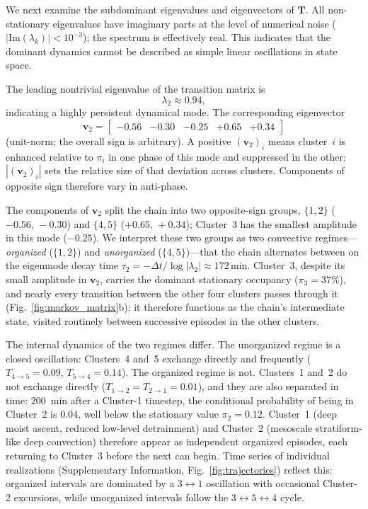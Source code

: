 \documentclass[11pt]{article}
\begin{document}
We next examine the subdominant eigenvalues and eigenvectors of
$\mathbf{T}$.
All non-stationary eigenvalues have imaginary parts at the level of numerical noise ($|\mathrm{Im}(\lambda_k)|<10^{-3}$); the spectrum is effectively real. This indicates that the dominant dynamics cannot be described as simple linear oscillations in state space.

The leading nontrivial eigenvalue of the transition matrix is
\begin{equation}
\lambda_2 \approx 0.94,
\end{equation}
indicating a highly persistent dynamical mode. The corresponding eigenvector
\begin{equation}
\mathbf{v}_2 =
\begin{bmatrix}
-0.56 & -0.30 & -0.25 & +0.65 & +0.34
\end{bmatrix}
\end{equation}
(unit-norm; the overall sign is arbitrary). A positive $(\mathbf{v}_2)_i$ means cluster~$i$ is enhanced relative to $\pi_i$ in one phase of this mode and suppressed in the other; $|(\mathbf{v}_2)_i|$ sets the relative size of that deviation across clusters. Components of opposite sign therefore vary in anti-phase.

The components of $\mathbf{v}_2$ split the chain into two opposite-sign groups, $\{1,2\}$ ($-0.56,\,-0.30$) and $\{4,5\}$ ($+0.65,\,+0.34$); Cluster~3 has the smallest amplitude in this mode ($-0.25$). We interpret these two groups as two convective regimes---\emph{organized} ($\{1,2\}$) and \emph{unorganized} ($\{4,5\}$)---that the chain alternates between on the eigenmode decay time $\tau_2 = -\Delta t / \log|\lambda_2| \approx 172\,\mathrm{min}$. Cluster~3, despite its small amplitude in $\mathbf{v}_2$, carries the dominant stationary occupancy ($\pi_3=37\%$), and nearly every transition between the other four clusters passes through it (Fig.~\ref{fig:markov_matrix}b); it therefore functions as the chain's intermediate state, visited routinely between successive episodes in the other clusters.

The internal dynamics of the two regimes differ. The unorganized regime is a closed oscillation: Clusters~4 and~5 exchange directly and frequently ($T_{4\to 5}=0.09$, $T_{5\to 4}=0.14$). The organized regime is not. Clusters~1 and~2 do not exchange directly ($T_{1\to 2}=T_{2\to 1}=0.01$), and they are also separated in time: $200$~min after a Cluster-1 timestep, the conditional probability of being in Cluster~2 is $0.04$, well below the stationary value $\pi_2=0.12$. Cluster~1 (deep moist ascent, reduced low-level detrainment) and Cluster~2 (mesoscale stratiform-like deep convection) therefore appear as independent organized episodes, each returning to Cluster~3 before the next can begin. Time series of individual realizations (Supplementary Information, Fig.~\ref{fig:trajectories}) reflect this: organized intervals are dominated by a $3\!\leftrightarrow\!1$ oscillation with occasional Cluster-2 excursions, while unorganized intervals follow the $3\!\leftrightarrow\!5\!\leftrightarrow\!4$ cycle.
\end{document}
